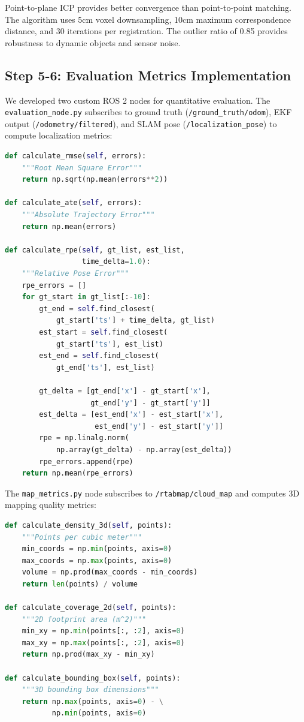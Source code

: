 \documentclass[conference]{IEEEtran}
\begin{document}
Point-to-plane ICP provides better convergence than point-to-point matching. The algorithm uses 5cm voxel downsampling, 10cm maximum correspondence distance, and 30 iterations per registration. The outlier ratio of 0.85 provides robustness to dynamic objects and sensor noise.

\subsection{Step 5-6: Evaluation Metrics Implementation}

We developed two custom ROS 2 nodes for quantitative evaluation. The \texttt{evaluation\_node.py} subscribes to ground truth (\texttt{/ground\_truth/odom}), EKF output (\texttt{/odometry/filtered}), and SLAM pose (\texttt{/localization\_pose}) to compute localization metrics:

\begin{lstlisting}[language=Python,caption={Metric Calculations (evaluation\_node.py)}]
def calculate_rmse(self, errors):
    """Root Mean Square Error"""
    return np.sqrt(np.mean(errors**2))

def calculate_ate(self, errors):
    """Absolute Trajectory Error"""
    return np.mean(errors)

def calculate_rpe(self, gt_list, est_list,
                  time_delta=1.0):
    """Relative Pose Error"""
    rpe_errors = []
    for gt_start in gt_list[:-10]:
        gt_end = self.find_closest(
            gt_start['ts'] + time_delta, gt_list)
        est_start = self.find_closest(
            gt_start['ts'], est_list)
        est_end = self.find_closest(
            gt_end['ts'], est_list)

        gt_delta = [gt_end['x'] - gt_start['x'],
                    gt_end['y'] - gt_start['y']]
        est_delta = [est_end['x'] - est_start['x'],
                     est_end['y'] - est_start['y']]
        rpe = np.linalg.norm(
            np.array(gt_delta) - np.array(est_delta))
        rpe_errors.append(rpe)
    return np.mean(rpe_errors)
\end{lstlisting}

The \texttt{map\_metrics.py} node subscribes to \texttt{/rtabmap/cloud\_map} and computes 3D mapping quality metrics:

\begin{lstlisting}[language=Python,caption={Map Metrics (map\_metrics.py)}]
def calculate_density_3d(self, points):
    """Points per cubic meter"""
    min_coords = np.min(points, axis=0)
    max_coords = np.max(points, axis=0)
    volume = np.prod(max_coords - min_coords)
    return len(points) / volume

def calculate_coverage_2d(self, points):
    """2D footprint area (m^2)"""
    min_xy = np.min(points[:, :2], axis=0)
    max_xy = np.max(points[:, :2], axis=0)
    return np.prod(max_xy - min_xy)

def calculate_bounding_box(self, points):
    """3D bounding box dimensions"""
    return np.max(points, axis=0) - \
           np.min(points, axis=0)
\end{lstlisting}
\end{document}
